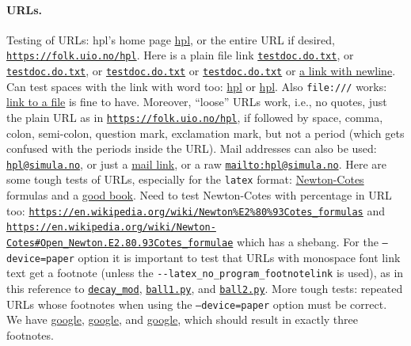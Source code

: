 \documentclass[%
oneside,                 %
final,                   %
10pt]{article}
\theoremstyle{definition}
\begin{document}
\begin{enumerate}
\paragraph{URLs.}
\label{subsubsec:ex}
Testing of URLs: hpl's home page \href{{https://folk.uio.no/hpl}}{hpl}, or
the entire URL if desired, \href{{https://folk.uio.no/hpl}}{\nolinkurl{https://folk.uio.no/hpl}}.  Here is a
plain file link \href{{testdoc.do.txt}}{\nolinkurl{testdoc.do.txt}}, or \href{{testdoc.do.txt}}{\nolinkurl{testdoc.do.txt}}, or
\href{{testdoc.do.txt}}{\nolinkurl{testdoc.do.txt}} or \href{{testdoc.do.txt}}{\nolinkurl{testdoc.do.txt}} or \href{{testdoc.do.txt}}{a link with
newline}. Can test spaces with the link with word
too: \href{{https://folk.uio.no/hpl}}{hpl} or \href{{https://folk.uio.no/hpl}}{hpl}. Also \texttt{file:///} works: \href{{file:///home/hpl/vc/doconce/doc/demos/manual/manual.html}}{link to a
file} is
fine to have. Moreover, ``loose'' URLs work, i.e., no quotes, just
the plain URL as in \href{{https://folk.uio.no/hpl}}{\nolinkurl{https://folk.uio.no/hpl}}, if followed by space, comma,
colon, semi-colon, question mark, exclamation mark, but not a period
(which gets confused with the periods inside the URL).
Mail addresses can also be used: \href{{mailto:hpl@simula.no}}{\nolinkurl{hpl@simula.no}}, or just a \href{{mailto:hpl@simula.no}}{mail link}, or a raw \href{{mailto:hpl@simula.no}}{\nolinkurl{mailto:hpl@simula.no}}.
Here are some tough tests of URLs, especially for the \texttt{latex} format:
\href{{https://en.wikipedia.org/wiki/Newton%E2%80%93Cotes_formulas}}{Newton-Cotes} formulas
and a \href{{https://www.springer.com/mathematics/computational+science+%26+engineering/book/978-3-642-23098-1}}{good book}. Need to test
Newton-Cotes with percentage in URL too:
\href{{https://en.wikipedia.org/wiki/Newton%E2%80%93Cotes_formulas}}{\nolinkurl{https://en.wikipedia.org/wiki/Newton\%E2\%80\%93Cotes_formulas}}
and \href{{https://en.wikipedia.org/wiki/Newton-Cotes#Open_Newton.E2.80.93Cotes_formulae}}{\nolinkurl{https://en.wikipedia.org/wiki/Newton-Cotes\#Open_Newton.E2.80.93Cotes_formulae}} which has a shebang.
For the \texttt{--device=paper} option it is important to test that URLs with
monospace font link text get a footnote
(unless the \Verb!--latex_no_program_footnotelink!
is used), as in this reference to
\href{{https://github.com/hplgit/INF5620/tree/gh-pages/src/decay/experiments/decay_mod.py}}{\nolinkurl{decay_mod}}, \href{{https://tinyurl.com/pwyasaa/formulas.ball1.py}}{\nolinkurl{ball1.py}},
and \href{{https://tinyurl.com/pwyasaa/formulas.ball2.py}}{\nolinkurl{ball2.py}}.
More tough tests: repeated URLs whose footnotes when using the
\texttt{--device=paper} option must be correct. We have
\href{{https://google.com}}{google}, \href{{https://google.com}}{google}, and
\href{{https://google.com}}{google}, which should result in exactly three
footnotes.

\end{enumerate}
\end{document}
